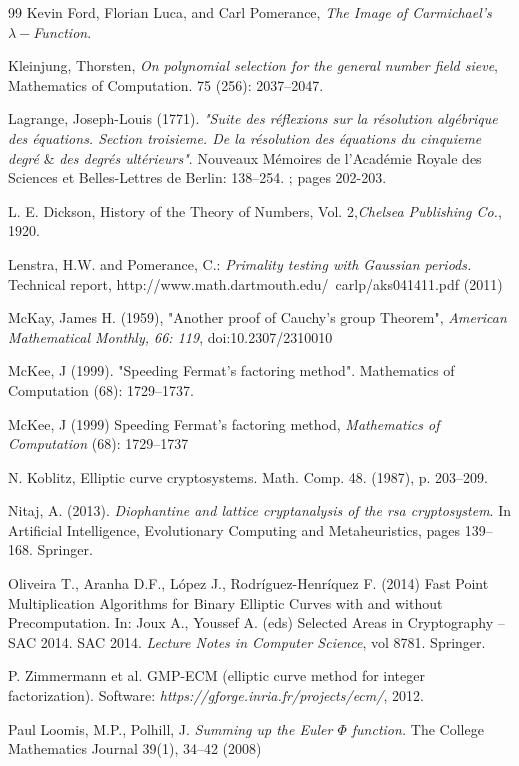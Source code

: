 \documentclass[sigconf,balance=false]{acmart}
\begin{document}
\begin{thebibliography}{99}
  Kevin Ford, Florian Luca, and Carl Pomerance, \emph{The Image of Carmichael’s $\lambda -$Function}.

 Kleinjung, Thorsten, \emph{On polynomial selection for the general number field 
	sieve}, Mathematics of Computation. 75 (256): 2037–2047.

 Lagrange, Joseph-Louis (1771). \emph{"Suite des réflexions sur la résolution algébrique des équations. Section troisieme. De la résolution des équations du cinquieme degré} \&  \emph{des degrés ultérieurs"}. Nouveaux Mémoires de l'Académie Royale des Sciences et Belles-Lettres de Berlin: 138–254. ; pages 202-203.

 L. E. Dickson, History of the Theory of Numbers, Vol. 2,\emph{Chelsea Publishing Co.}, 1920.

 Lenstra, H.W. and Pomerance, C.: \emph{Primality testing with Gaussian periods.} Technical report, http://www.math.dartmouth.edu/~carlp/aks041411.pdf (2011)

 McKay, James H. (1959), "Another proof of Cauchy's group Theorem", \emph{American Mathematical Monthly, 66: 119}, doi:10.2307/2310010

 McKee, J (1999). "Speeding Fermat's factoring method". Mathematics of Computation (68): 1729–1737.

 McKee, J (1999) Speeding Fermat's factoring method, \emph{Mathematics of Computation} (68): 1729–1737


 N. Koblitz, Elliptic curve cryptosystems. Math. Comp. 48. (1987), p. 203–209.

 Nitaj, A. (2013). \emph{Diophantine and lattice cryptanalysis of the rsa cryptosystem}. In Artificial Intelligence, Evolutionary Computing and Metaheuristics, pages
139–168. Springer.

 Oliveira T., Aranha D.F., López J., Rodríguez-Henríquez F. (2014) Fast Point Multiplication Algorithms for Binary Elliptic Curves with and without Precomputation. In: Joux A., Youssef A. (eds) Selected Areas in Cryptography -- SAC 2014. SAC 2014. \emph{Lecture Notes in Computer Science}, vol 8781. Springer.

 P. Zimmermann et al. GMP-ECM (elliptic curve method for integer factorization). Software: \emph{https://gforge.inria.fr/projects/ecm/}, 2012.

 Paul Loomis, M.P., Polhill, J. \emph{Summing up the Euler $\Phi$ function.} The College Mathematics Journal 39(1), 34–42 (2008)


\end{thebibliography}
\end{document}
